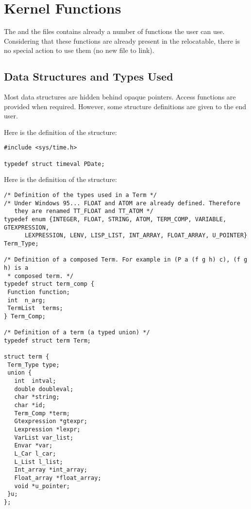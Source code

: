 \section{Kernel Functions}

The  and the  files contains
already a number of functions the user can use. Considering that these
functions are already present in the relocatable, there is no special action to
use them (no new file to link).



\subsection{Data Structures and Types Used}

Most data structures are hidden behind opaque pointers. Access functions
are provided when required. However, some structure definitions are given
to the end user.

Here is the definition of the  structure:
\begin{verbatim}
#include <sys/time.h>

typedef struct timeval PDate;
\end{verbatim}

Here is the definition of the  structure:
\begin{verbatim}
/* Definition of the types used in a Term */
/* Under Windows 95... FLOAT and ATOM are already defined. Therefore
   they are renamed TT_FLOAT and TT_ATOM */
typedef enum {INTEGER, FLOAT, STRING, ATOM, TERM_COMP, VARIABLE, GTEXPRESSION,
      LEXPRESSION, LENV, LISP_LIST, INT_ARRAY, FLOAT_ARRAY, U_POINTER} Term_Type;

/* Definition of a composed Term. For example in (P a (f g h) c), (f g h) is a
 * composed term. */
typedef struct term_comp {
 Function function;
 int  n_arg;
 TermList  terms;
} Term_Comp;

/* Definition of a term (a typed union) */
typedef struct term Term;

struct term {
 Term_Type type;
 union {
   int  intval;
   double doubleval;
   char *string;
   char *id;
   Term_Comp *term;
   Gtexpression *gtexpr;
   Lexpression *lexpr;
   VarList var_list;
   Envar *var;
   L_Car l_car;
   L_List l_list;
   Int_array *int_array;
   Float_array *float_array;
   void *u_pointer;
 }u;
};
\end{verbatim}

